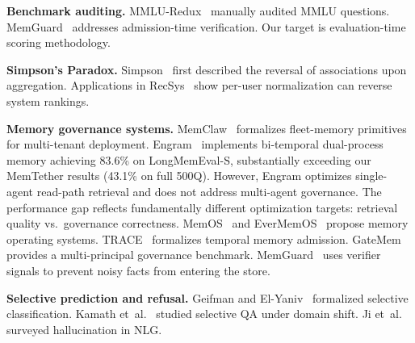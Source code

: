 \documentclass{article}
\begin{document}
\textbf{Benchmark auditing.} MMLU-Redux~\citep{mmluredux2024} manually audited MMLU questions. MemGuard~\citep{memguard2026} addresses admission-time verification. Our target is evaluation-time scoring methodology.

\textbf{Simpson's Paradox.} Simpson~\citep{simpson1951} first described the reversal of associations upon aggregation. Applications in RecSys~\citep{simpsonrecsys} show per-user normalization can reverse system rankings.

\textbf{Memory governance systems.} MemClaw~\citep{memclaw2026} formalizes fleet-memory primitives for multi-tenant deployment. Engram~\citep{engram2026} implements bi-temporal dual-process memory achieving 83.6\% on LongMemEval-S, substantially exceeding our MemTether results (43.1\% on full 500Q). However, Engram optimizes single-agent read-path retrieval and does not address multi-agent governance. The performance gap reflects fundamentally different optimization targets: retrieval quality vs.\ governance correctness. MemOS~\citep{memos2025} and EverMemOS~\citep{evermemos2026} propose memory operating systems. TRACE~\citep{trace2026} formalizes temporal memory admission. GateMem~\citep{gatemem2026} provides a multi-principal governance benchmark. MemGuard~\citep{memguard2026} uses verifier signals to prevent noisy facts from entering the store.

\textbf{Selective prediction and refusal.} Geifman and El-Yaniv~\citep{geifman2017selective} formalized selective classification. Kamath et~al.~\citep{kamath2020selective} studied selective QA under domain shift. Ji et~al.~\citep{ji2023hallucination} surveyed hallucination in NLG.
\end{document}
